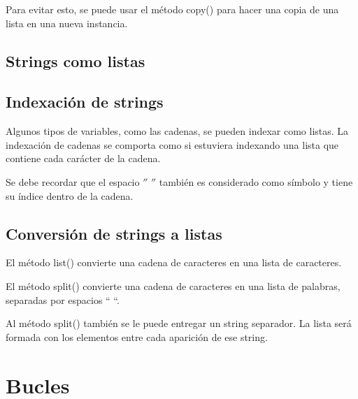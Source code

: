 \documentclass{report}
\begin{document}
{

Para evitar esto, se puede usar el método copy() para hacer una copia de una lista en una nueva instancia.


\section{Strings como listas}


\section{Indexación de strings}

Algunos tipos de variables, como las cadenas, se pueden indexar como listas. La indexación de cadenas se comporta como si estuviera indexando una lista que contiene cada carácter de la cadena.


Se debe recordar que el espacio $''$ $''$ también es considerado como símbolo y tiene su índice dentro de la cadena.

\section{Conversión de strings a listas}

El método list() convierte una cadena de caracteres en una lista de caracteres.


El método split() convierte una cadena de caracteres en una lista de palabras, separadas por espacios “ “.



Al método split() también se le puede entregar un string separador. La lista será formada con los elementos entre cada aparición de ese string.


\clearpage\chapter{Bucles}

}
\end{document}
